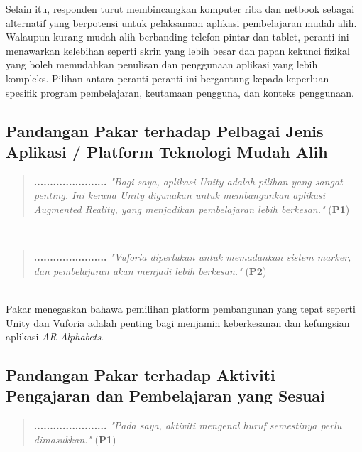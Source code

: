 {{Selain itu, responden turut membincangkan komputer riba dan netbook sebagai alternatif yang berpotensi untuk pelaksanaan aplikasi pembelajaran mudah alih. Walaupun kurang mudah alih berbanding telefon pintar dan tablet, peranti ini menawarkan kelebihan seperti skrin yang lebih besar dan papan kekunci fizikal yang boleh memudahkan penulisan dan penggunaan aplikasi yang lebih kompleks. Pilihan antara peranti-peranti ini bergantung kepada keperluan spesifik program pembelajaran, keutamaan pengguna, dan konteks penggunaan.

\subsection{{Pandangan Pakar terhadap Pelbagai Jenis Aplikasi / Platform Teknologi Mudah Alih}}

\begin{quote}\begin{center}\textbf{.......................} \textit{"Bagi saya, aplikasi Unity adalah pilihan yang sangat penting. Ini kerana Unity digunakan untuk membangunkan aplikasi Augmented Reality, yang menjadikan pembelajaran lebih berkesan."} (\textbf{P1})\end{center}\end{quote}\\
\begin{quote}
\begin{center}\textbf{.......................} \textit{"Vuforia diperlukan untuk memadankan sistem marker, dan pembelajaran akan menjadi lebih berkesan."} (\textbf{P2})\end{center}\end{quote}\\
Pakar menegaskan bahawa pemilihan platform pembangunan yang tepat seperti Unity dan Vuforia adalah penting bagi menjamin keberkesanan dan kefungsian aplikasi \textit{AR Alphabets}.


\subsection{Pandangan Pakar terhadap Aktiviti Pengajaran dan Pembelajaran yang Sesuai}


\begin{quote}
\begin{center}
\textbf{.......................} \textit{"Pada saya, aktiviti mengenal huruf semestinya perlu dimasukkan."} (\textbf{P1})
\end{center}
\end{quote}\\

}}
